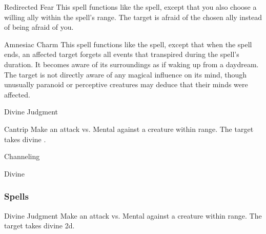 \lowercase{\hypertarget{spell:Redirected Fear}{}}\label{spell:Redirected Fear}
\begin{ability}[\nth{2}]{\hypertarget{spell:Redirected Fear}{Redirected Fear}}
This spell functions like the  spell, except that you also choose a willing ally within the spell's range.
The target is afraid of the chosen ally instead of being afraid of you.
\end{ability}
\vspace{0.25em}



\lowercase{\hypertarget{spell:Amnesiac Charm}{}}\label{spell:Amnesiac Charm}
\begin{ability}[\nth{5}]{\hypertarget{spell:Amnesiac Charm}{Amnesiac Charm}}
This spell functions like the  spell, except that when the spell ends, an affected target forgets all events that transpired during the spell's duration.
It becomes aware of its surroundings as if waking up from a daydream.
The target is not directly aware of any magical influence on its mind, though unusually paranoid or perceptive creatures may deduce that their minds were affected.
\end{ability}
\vspace{0.25em}


\newpage
\begin{spellsection}{Divine Judgment}

\begin{spellheader}
\end{spellheader}


\begin{ability}{Cantrip}
Make an attack vs. Mental against a creature within \rngmed range.
\hit The target takes divine .
\end{ability}




 Channeling

 Divine
\end{spellsection}


\subsubsection{Spells}


\lowercase{\hypertarget{spell:Divine Judgment}{}}\label{spell:Divine Judgment}
\begin{ability}[\nth{1}]{\hypertarget{spell:Divine Judgment}{Divine Judgment}}
Make an attack vs. Mental against a creature within \rngmed range.
\hit The target takes divine  \plus2d.
\end{ability}
\vspace{0.25em}



